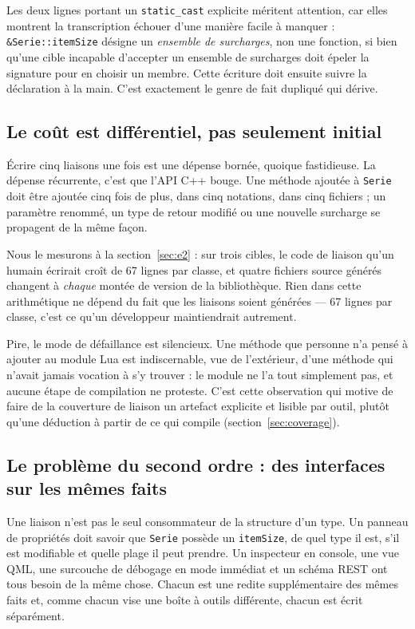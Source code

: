 \documentclass[11pt,a4paper]{article}
\newcommand{\code}[1]{\texttt{\small #1}}
\begin{document}
Les deux lignes portant un \code{static\_cast} explicite méritent attention, car
elles montrent la transcription échouer d'une manière facile à manquer :
\code{\&Serie::itemSize} désigne un \emph{ensemble de surcharges}, non une
fonction, si bien qu'une cible incapable d'accepter un ensemble de surcharges
doit épeler la signature pour en choisir un membre. Cette écriture doit ensuite
suivre la déclaration à la main. C'est exactement le genre de fait dupliqué qui
dérive.

\subsection{Le coût est différentiel, pas seulement initial}

Écrire cinq liaisons une fois est une dépense bornée, quoique fastidieuse. La
dépense récurrente, c'est que l'API C++ bouge. Une méthode ajoutée à
\code{Serie} doit être ajoutée cinq fois de plus, dans cinq notations, dans cinq
fichiers ; un paramètre renommé, un type de retour modifié ou une nouvelle
surcharge se propagent de la même façon.

Nous le mesurons à la section~\ref{sec:e2} : sur trois cibles, le code de
liaison qu'un humain écrirait croît de 67 lignes par classe, et quatre fichiers
source générés changent à \emph{chaque} montée de version de la bibliothèque.
Rien dans cette arithmétique ne dépend du fait que les liaisons soient
générées --- 67 lignes par classe, c'est ce qu'un développeur maintiendrait
autrement.

Pire, le mode de défaillance est silencieux. Une méthode que personne n'a pensé
à ajouter au module Lua est indiscernable, vue de l'extérieur, d'une méthode qui
n'avait jamais vocation à s'y trouver : le module ne l'a tout simplement pas, et
aucune étape de compilation ne proteste. C'est cette observation qui motive de
faire de la couverture de liaison un artefact explicite et lisible par outil,
plutôt qu'une déduction à partir de ce qui compile
(section~\ref{sec:coverage}).

\subsection{Le problème du second ordre : des interfaces sur les mêmes faits}

Une liaison n'est pas le seul consommateur de la structure d'un type. Un panneau
de propriétés doit savoir que \code{Serie} possède un \code{itemSize}, de quel
type il est, s'il est modifiable et quelle plage il peut prendre. Un inspecteur
en console, une vue QML, une surcouche de débogage en mode immédiat et un schéma
REST ont tous besoin de la même chose. Chacun est une redite supplémentaire des
mêmes faits et, comme chacun vise une boîte à outils différente, chacun est
écrit séparément.
\end{document}
